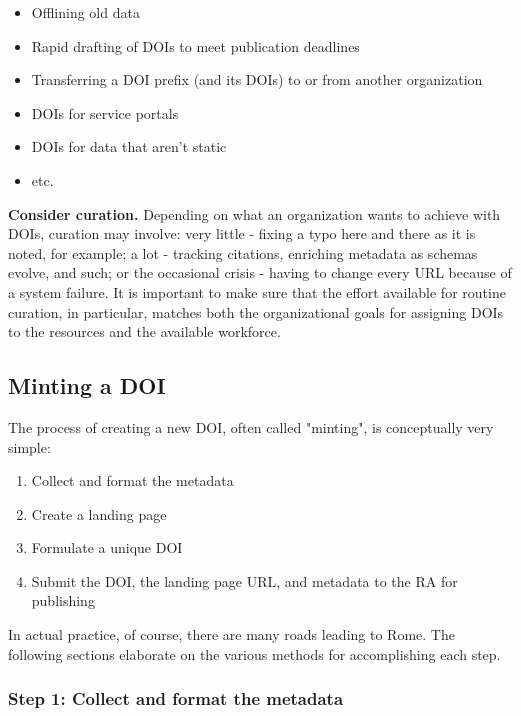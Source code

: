 \documentclass[11pt,a4paper]{ivoa}
\begin{document}
\begin{itemize}
\item{} Offlining old data
\item{} Rapid drafting of DOIs to meet publication deadlines
\item{} Transferring a DOI prefix (and its DOIs) to or from another organization
\item{} DOIs for service portals
\item{} DOIs for data that aren't static
\item{} etc.
\end{itemize}

\textbf{Consider curation.} Depending on what an organization wants to achieve with DOIs, curation may involve: very little - fixing a typo here and there as it is noted, for example; a lot - tracking citations, enriching metadata as schemas evolve, and such; or the occasional crisis - having to change every URL because of a system failure. It is important to make sure that the effort available for routine curation, in particular, matches both the organizational goals for assigning DOIs to the resources and the available workforce.

\subsection{Minting a DOI}\hypertarget{minting-a-doi}{}\label{sec:minting-a-doi}

The process of creating a new DOI, often called "minting", is conceptually very simple:

\begin{enumerate}
\item{} Collect and format the metadata
\item{} Create a landing page
\item{} Formulate a unique DOI
\item{} Submit the DOI, the landing page URL, and metadata to the RA for publishing
\end{enumerate}

In actual practice, of course, there are many roads leading to Rome. The following sections elaborate on the various methods for accomplishing each step.

\subsubsection{Step 1: Collect and format the metadata}\hypertarget{step-1-collect-and-format-the-metadata}{}\label{sec:step-1-collect-and-format-the-metadata}
\end{document}
